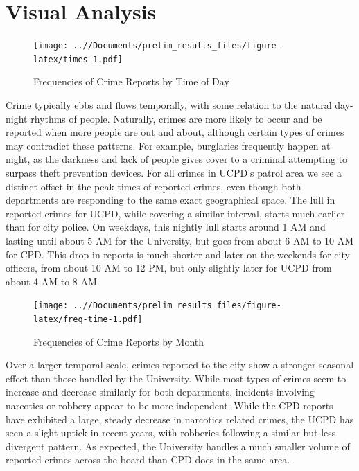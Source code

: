 \documentclass{ucetd}
\begin{document}
\hypertarget{visual-analysis-1}{%
\section{Visual Analysis}\label{visual-analysis-1}}

\begin{figure}
\centering
\texttt{[image: ..//Documents/prelim\_results\_files/figure-latex/times-1.pdf]}
\caption{Frequencies of Crime Reports by Time of Day}
\end{figure}

Crime typically ebbs and flows temporally, with some relation to the
natural day-night rhythms of people. Naturally, crimes are more likely
to occur and be reported when more people are out and about, although
certain types of crimes may contradict these patterns. For example,
burglaries frequently happen at night, as the darkness and lack of
people gives cover to a criminal attempting to surpass theft prevention
devices. For all crimes in UCPD's patrol area we see a distinct offset
in the peak times of reported crimes, even though both departments are
responding to the same exact geographical space. The lull in reported
crimes for UCPD, while covering a similar interval, starts much earlier
than for city police. On weekdays, this nightly lull starts around 1 AM
and lasting until about 5 AM for the University, but goes from about 6
AM to 10 AM for CPD. This drop in reports is much shorter and later on
the weekends for city officers, from about 10 AM to 12 PM, but only
slightly later for UCPD from about 4 AM to 8 AM.

\begin{figure}
\centering
\texttt{[image: ..//Documents/prelim\_results\_files/figure-latex/freq-time-1.pdf]}
\caption{Frequencies of Crime Reports by Month}
\end{figure}

Over a larger temporal scale, crimes reported to the city show a
stronger seasonal effect than those handled by the University. While
most types of crimes seem to increase and decrease similarly for both
departments, incidents involving narcotics or robbery appear to be more
independent. While the CPD reports have exhibited a large, steady
decrease in narcotics related crimes, the UCPD has seen a slight uptick
in recent years, with robberies following a similar but less divergent
pattern. As expected, the University handles a much smaller volume of
reported crimes across the board than CPD does in the same area.
\end{document}
